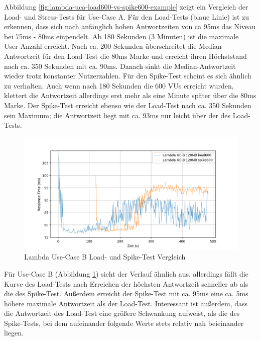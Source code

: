 Abbildung \ref{fig:lambda-uca-load600-vs-spike600-example} zeigt ein Vergleich der Load- und Stress-Tests für Use-Case A. Für den Load-Tests (blaue Linie) ist zu erkennen, dass sich nach anfänglich hohen Antwortzeiten von ca 95ms das Niveau bei 75ms - 80ms einpendelt. Ab 180 Sekunden (3 Minuten) ist die maximale User-Anzahl erreicht. Nach ca. 200 Sekunden überschreitet die Median-Antwortzeit für den Load-Test die 80ms Marke und erreicht ihren Höchststand nach ca. 350 Sekunden mit ca. 90ms. Danach sinkt die Median-Antwortzeit wieder trotz konstanter Nutzerzahlen.
Für den Spike-Test scheint es sich ähnlich zu verhalten. Auch wenn nach 180 Sekunden die 600 VUs erreicht wurden, klettert die Antwortzeit allerdings erst mehr als eine Minute später über die 80ms Marke. Der Spike-Test erreicht ebenso wie der Load-Test nach ca. 350 Sekunden sein Maximum; die Antwortzeit liegt mit ca. 93ms nur leicht über der des Load-Tests.

\begin{figure}[H]
    \includegraphics[width=\textwidth]{img/lambda-ucb-load600-vs-spike600-example.png}
    \caption[Lambda Use-Case B Load- und Spike-Test Vergleich]{Lambda Use-Case B Load- und Spike-Test Vergleich}
    \label{fig:lambda-ucb-load600-vs-spike600-example}
\end{figure}

Für Use-Case B (Abbildung \ref{fig:lambda-ucb-load600-vs-spike600-example}) sieht der Verlauf ähnlich aus, allerdings fällt die Kurve des Load-Tests nach Erreichen der höchsten Antwortzeit schneller ab als die des Spike-Test. Außerdem erreicht der Spike-Test mit ca. 95ms eine ca. 5ms höhere maximale Antwortzeit als der Load-Test. Interessant ist außerdem, dass die Antwortzeit des Load-Test eine größere Schwankung aufweist, als die des Spike-Tests, bei dem aufeinander folgende Werte stets relativ nah beieinander liegen.

